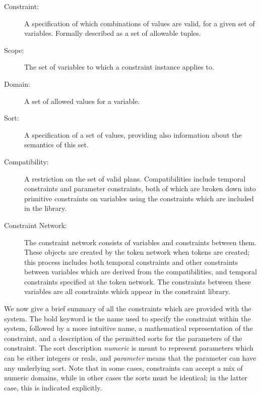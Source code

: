\begin{description}
  \item[Constraint:] A specification of which combinations of values
are valid, for a given set of variables.  Formally described as a set
of allowable tuples.
  \item[Scope:] The set of variables to which a constraint instance
applies to.
  \item[Domain:] A set of allowed values for a variable.
  \item[Sort:] A specification of a set of values, providing also
information about the semantics of this set.
  \item[Compatibility:] A restriction on the set of valid plans.
Compatibilities include temporal constraints and parameter constraints,
both of which are broken down into primitive constraints on variables
using the constraints which are included in the library.
  \item[Constraint Network:] The constraint network consists of variables
and constraints between them.  These objects are created by the token network
when tokens are created; this process includes both temporal constraints
and other constraints between variables which are derived from the compatibilities,
and temporal constraints specified at the token network.  The constraints
between these variables are all constraints which appear in the 
constraint library.
  \end{description}


We now give a brief summary of all the constraints which are provided
with the system. The bold keyword is the name used to specify the
constraint within the system, followed by a more intuitive name, a
mathematical representation of the constraint, and a description of
the permitted sorts for the parameters of the constraint.  The sort
description {\em numeric} is meant to represent parameters which can
be either integers or reals, and {\em parameter} means that the
parameter can have any underlying sort.  Note that in some cases, constraints
can accept a mix of numeric domains, while in other cases the sorts must
be identical; in the latter case, this is indicated explicitly.

